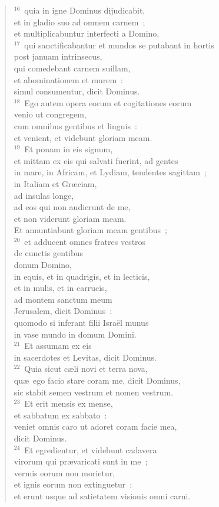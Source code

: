 \begin{verse}
${}^{16}$~quia in igne Dominus dijudicabit,\\ et in gladio suo ad omnem carnem~;\\ et multiplicabuntur interfecti a Domino,\\
${}^{17}$~qui sanctificabantur et mundos se putabant in hortis\\ post januam intrinsecus,\\ qui comedebant carnem suillam,\\ et abominationem et murem~:\\ simul consumentur, dicit Dominus.\\
${}^{18}$~Ego autem opera eorum et cogitationes eorum\\ venio ut congregem,\\ cum omnibus gentibus et linguis~:\\ et venient, et videbunt gloriam meam.\\
${}^{19}$~Et ponam in eis signum,\\ et mittam ex eis qui salvati fuerint, ad gentes\\ in mare, in Africam, et Lydiam, tendentes sagittam~;\\ in Italiam et Gr\ae ciam,\\ ad insulas longe,\\ ad eos qui non audierunt de me,\\ et non viderunt gloriam meam.\\ Et annuntiabunt gloriam meam gentibus~;\\
${}^{20}$~et adducent omnes fratres vestros\\ de cunctis gentibus\\ donum Domino,\\ in equis, et in quadrigis, et in lecticis,\\ et in mulis, et in carrucis,\\ ad montem sanctum meum\\ Jerusalem, dicit Dominus~:\\ quomodo si inferant filii Isra\"el munus\\ in vase mundo in domum Domini.\\
${}^{21}$~Et assumam ex eis\\ in sacerdotes et Levitas, dicit Dominus.\\
${}^{22}$~Quia sicut c\ae li novi et terra nova,\\ qu\ae\ ego facio stare coram me, dicit Dominus,\\ sic stabit semen vestrum et nomen vestrum.\\
${}^{23}$~Et erit mensis ex mense,\\ et sabbatum ex sabbato~:\\ veniet omnis caro ut adoret coram facie mea,\\ dicit Dominus.\\
${}^{24}$~Et egredientur, et videbunt cadavera\\ virorum qui pr\ae varicati sunt in me~;\\ vermis eorum non morietur,\\ et ignis eorum non extinguetur~:\\ et erunt usque ad satietatem visionis omni carni.\end{verse}


